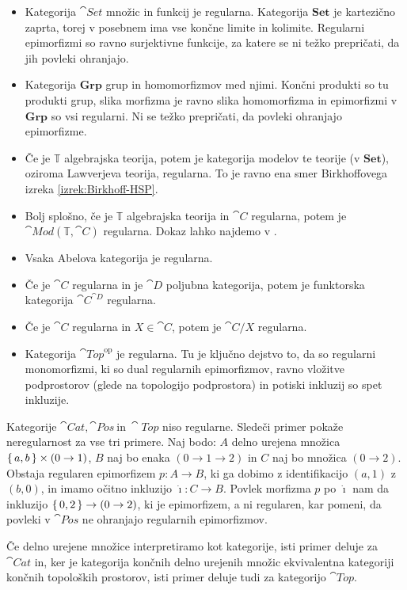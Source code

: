 \documentclass[../kategoricna_logika.tex]{subfiles}
\begin{document}
\begin{primer}
  \hfill
  \begin{itemize}
  \item Kategorija $\cat{Set}$ množic in funkcij je
    regularna. Kategorija $\mathbf{Set}$ je kartezično zaprta, torej v
    posebnem ima vse končne limite in kolimite.  Regularni epimorfizmi
    so ravno surjektivne funkcije, za katere se ni težko prepričati,
    da jih povleki ohranjajo.
  \item Kategorija $\mathbf{Grp}$ grup in homomorfizmov med njimi.
    Končni produkti so tu produkti grup, slika morfizma je ravno slika
    homomorfizma in epimorfizmi v $\mathbf{Grp}$ so vsi regularni. Ni se
    težko prepričati, da povleki ohranjajo epimorfizme.
  \item Če je $\mathbb{T}$ algebrajska teorija, potem je kategorija
    modelov te teorije (v $\mathbf{Set}$), oziroma Lawverjeva teorija,
    regularna.  To je ravno ena smer Birkhoffovega izreka
    \ref{izrek:Birkhoff-HSP}.
  \item Bolj splošno, če je $\mathbb{T}$ algebrajska teorija in
    $\cat{C}$ regularna, potem je $\cat{Mod}(\mathbb{T}, \cat{C})$
    regularna. Dokaz lahko najdemo v \cite{barr-exact-categories}.
  \item Vsaka Abelova kategorija je regularna.
  \item Če je $\cat{C}$ regularna in je $\cat{D}$ poljubna kategorija,
    potem je funktorska kategorija $\cat{C}^{\cat{D}}$ regularna.
  \item Če je $\cat{C}$ regularna in $X \in \cat{C}$, potem je
    $\cat{C}/X$ regularna.
  \item Kategorija $\cat{Top}^{\mathrm{op}}$ je regularna. Tu je
    ključno dejstvo to, da so regularni monomorfizmi, ki so dual
    regularnih epimorfizmov, ravno vložitve podprostorov (glede na
    topologijo podprostora) in potiski inkluzij so spet inkluzije.
  \end{itemize}
\end{primer}
\begin{primer}
  Kategorije $\cat{Cat}, \cat{Pos}\ \text{in}\ \cat{Top}$ niso
  regularne.  Sledeči primer pokaže neregularnost za vse tri primere.
  Naj bodo: $A$ delno urejena množica $\left\lbrace\,a, b\,\right\rbrace \times (0 \to 1)$,
  $B$ naj bo enaka $(0 \to 1 \to 2)$ in $C$ naj bo množica
  $(0 \to 2)$.  Obstaja regularen epimorfizem ${p : A \to B}$, ki ga
  dobimo z identifikacijo $(a,1)$ z $(b, 0)$, in imamo očitno
  inkluzijo ${\dot{\imath} : C \to B}$. Povlek morfizma $p$ po
  $\dot{\imath}$ nam da inkluzijo $\left\lbrace\,0, 2\,\right\rbrace \to (0 \to 2)$, ki je
  epimorfizem, a ni regularen, kar pomeni, da povleki v $\cat{Pos}$ ne
  ohranjajo regularnih epimorfizmov.

  Če delno urejene množice interpretiramo kot kategorije, isti primer
  deluje za $\cat{Cat}$ in, ker je kategorija končnih delno urejenih
  množic ekvivalentna kategoriji končnih topoloških prostorov, isti
  primer deluje tudi za kategorijo $\cat{Top}$.
\end{primer}
\end{document}

